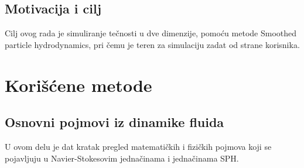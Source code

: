 \documentclass[12pt]{article}
\begin{document}
    \subsection{Motivacija i cilj}\label{motivacija}
        Cilj ovog rada je simuliranje te\v cnosti u dve dimenzije, pomo\'cu metode Smoothed particle hydrodynamics, pri \v cemu je teren za simulaciju zadat od strane korisnika.

\section{Kori\v s\'cene metode}
    \subsection{Osnovni pojmovi iz dinamike fluida}
        U ovom delu je dat kratak pregled matemati\v ckih i fizi\v ckih pojmova koji se pojavljuju u Navier-Stokesovim jedna\v cinama i jedna\v cinama SPH.
        \label{definicije}
\end{document}
